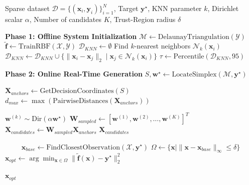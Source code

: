 \begin{algorithm}[!htbp]
\caption{Geometrically Bounded Probabilistic Inversion (GBPI)}
\label{alg:gbpi}
\begin{algorithmic}[1]
\Require Sparse dataset $\mathcal{D} = \{(\mathbf{x}_i, \mathbf{y}_i)\}_{i=1}^N$, Target $\mathbf{y}^\star$, KNN parameter $k$, Dirichlet scalar $\alpha$, Number of candidates $K$, Trust-Region radius $\delta$

\Statex \textbf{Phase 1: Offline System Initialization}
\State $\mathcal{M} \gets \text{DelaunayTriangulation}(\mathcal{Y})$ 
\State $\tilde{\mathbf{f}} \gets \text{TrainRBF}(\mathcal{X}, \mathcal{Y})$ 
\State $\mathcal{D}_{KNN} \gets \emptyset$
    \State Find $k$-nearest neighbors $\mathcal{N}_k(\mathbf{x}_i)$
    \State $\mathcal{D}_{KNN} \gets \mathcal{D}_{KNN} \cup \{ \|\mathbf{x}_i - \mathbf{x}_j\|_2 \mid \mathbf{x}_j \in \mathcal{N}_k(\mathbf{x}_i) \}$
\EndFor
\State $\tau \gets \text{Percentile}(\mathcal{D}_{KNN}, 95)$ 

\Statex
\Statex \textbf{Phase 2: Online Real-Time Generation}
    \State $S, \mathbf{w}^\star \gets \text{LocateSimplex}(\mathcal{M}, \mathbf{y}^\star)$ 
    
     
        \State $\mathbf{X}_{anchors} \gets \text{GetDecisionCoordinates}(S)$
        \State $d_{max} \gets \max \left( \text{PairwiseDistances}(\mathbf{X}_{anchors}) \right)$
        
         
                \State $\mathbf{w}^{(k)} \sim \mathrm{Dir}(\alpha \mathbf{w}^\star)$ 
            \EndFor
            \State $\mathbf{W}_{sampled} \gets [\mathbf{w}^{(1)}, \mathbf{w}^{(2)}, \dots, \mathbf{w}^{(K)}]^T$
            \State $\mathbf{X}_{candidates} \gets \mathbf{W}_{sampled} \mathbf{X}_{anchors}$
            \State \Return $\mathbf{X}_{candidates}$
        \EndIf
    \EndIf
    
    \Statex \ \ \ \ 
    \State $\mathbf{x}_{base} \gets \text{FindClosestObservation}(\mathcal{X}, \mathbf{y}^\star)$
    \State $\Omega \gets \{ \mathbf{x} \mid \|\mathbf{x} - \mathbf{x}_{base}\|_\infty \le \delta \}$ 
    \State $\mathbf{x}_{opt} \gets \arg\min_{\mathbf{x} \in \Omega} \| \tilde{\mathbf{f}}(\mathbf{x}) - \mathbf{y}^\star \|_2^2$ 
    
    \State \Return $\mathbf{x}_{opt}$
\EndFunction
\end{algorithmic}
\end{algorithm}

